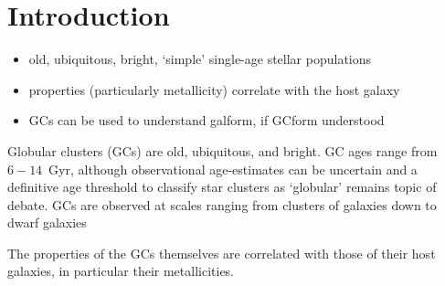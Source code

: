 \documentclass[a4paper,fleqn,usenatbib]{mnras}
\begin{document}
\section{Introduction}
\begin{itemize}
    \item old, ubiquitous, bright, `simple' single-age stellar populations
    \item properties (particularly metallicity) correlate with the host galaxy
    \item GCs can be used to understand galform, if GCform understood
\end{itemize}
Globular clusters (GCs) are old, ubiquitous, and bright. 
GC ages range from $6-14$~Gyr, although observational age-estimates can be 
uncertain and a definitive age threshold to classify star clusters as `globular' 
remains topic of debate.
GCs are observed at scales ranging from clusters of galaxies down to 
dwarf galaxies 

The properties of the GCs themselves are correlated with those of their host
galaxies, in particular their metallicities. 

% 
% 
\end{document}

